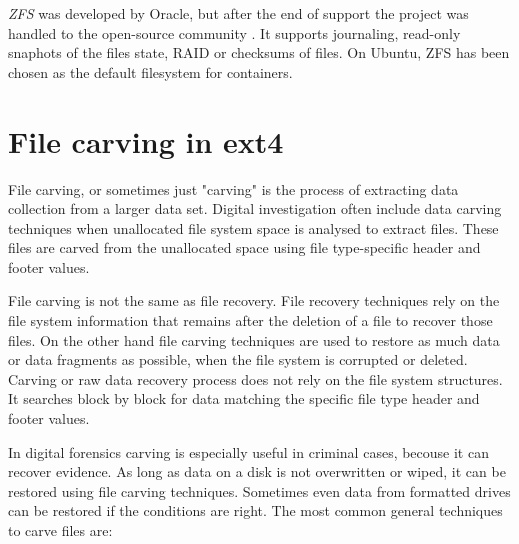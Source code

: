 \documentclass{acm_proc_article-sp}
\begin{document}
{\it ZFS} \cite{zfs} was developed by Oracle, but after the end of support the project was handled to the open-source community \cite{openzfs}. It supports journaling, read-only snaphots of the files state, RAID or checksums of files. On Ubuntu, ZFS has been chosen as the default filesystem for containers.

\section{File carving in ext4}

File carving, or sometimes just "carving" is the process of extracting data collection from a larger data set. Digital investigation often include data carving techniques when unallocated file system space is analysed to extract files. These files are carved from the unallocated space using file type-specific header and footer values\cite{merola2008data}.

File carving is not the same as file recovery. File recovery techniques rely on the file system information that remains after the deletion of a file to recover those files. On the other hand file carving techniques are used to restore as much data or data fragments as possible, when the file system is corrupted or deleted. Carving or raw data recovery process does not rely on the file system structures. It searches block by block for data matching the specific file type header and footer values\cite{beek2011introduction}. 

In digital forensics carving is especially useful in criminal cases, becouse it can recover evidence. As long as data on a disk is not overwritten or wiped, it can be restored using file carving techniques. Sometimes even data from formatted drives can be restored if the conditions are right. The most common general techniques to carve files are\cite{hadi2016reviewing}:
\end{document}
